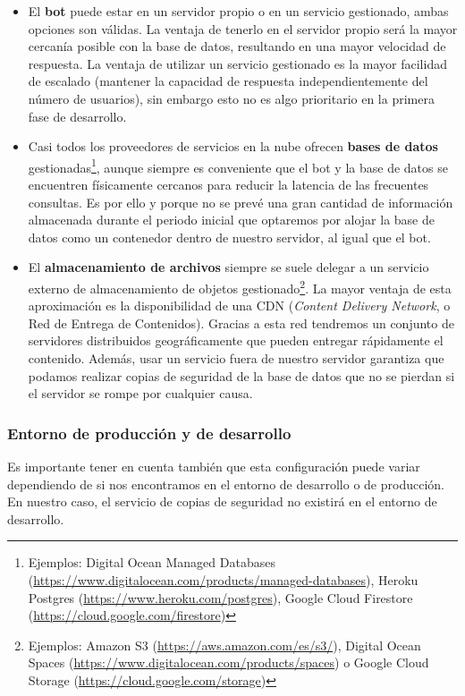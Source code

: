 \begin{itemize}
    \item El \textbf{bot} puede estar en un servidor propio o en un servicio gestionado, ambas opciones son válidas. La ventaja de tenerlo en el servidor propio será la mayor cercanía posible con la base de datos, resultando en una mayor velocidad de respuesta. La ventaja de utilizar un servicio gestionado es la mayor facilidad de escalado (mantener la capacidad de respuesta independientemente del número de usuarios), sin embargo esto no es algo prioritario en la primera fase de desarrollo.
    \item Casi todos los proveedores de servicios en la nube ofrecen \textbf{bases de datos} gestionadas\footnote{Ejemplos: Digital Ocean Managed Databases (\url{https://www.digitalocean.com/products/managed-databases}), Heroku Postgres (\url{https://www.heroku.com/postgres}), Google Cloud Firestore (\url{https://cloud.google.com/firestore})}, aunque siempre es conveniente que el bot y la base de datos se encuentren físicamente cercanos para reducir la latencia de las frecuentes consultas. Es por ello y porque no se prevé una gran cantidad de información almacenada durante el periodo inicial que optaremos por alojar la base de datos como un contenedor dentro de nuestro servidor, al igual que el bot.
    \item El \textbf{almacenamiento de archivos} siempre se suele delegar a un servicio externo de almacenamiento de objetos gestionado\footnote{Ejemplos: Amazon S3 (\url{https://aws.amazon.com/es/s3/}), Digital Ocean Spaces (\url{https://www.digitalocean.com/products/spaces}) o Google Cloud Storage (\url{https://cloud.google.com/storage})}. La mayor ventaja de esta aproximación es la disponibilidad de una CDN (\textit{Content Delivery Network}, o Red de Entrega de Contenidos)\cite{whatIsCDN}. Gracias a esta red tendremos un conjunto de servidores distribuidos geográficamente que pueden entregar rápidamente el contenido. Además, usar un servicio fuera de nuestro servidor garantiza que podamos realizar copias de seguridad de la base de datos que no se pierdan si el servidor se rompe por cualquier causa. 
\end{itemize}


\subsubsection{Entorno de producción y de desarrollo}

Es importante tener en cuenta también que esta configuración puede variar dependiendo de si nos encontramos en el entorno de desarrollo o de producción. En nuestro caso, el servicio de copias de seguridad no existirá en el entorno de desarrollo. 

